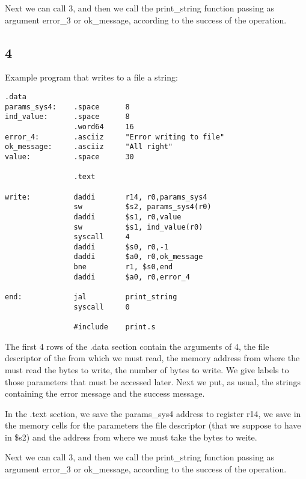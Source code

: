 Next we can call \SC{} 3, and then we call the print\_string function passing as
argument error\_3 or ok\_message, according to the success of the operation.

\OF{}

\subsection{\SC{} 4}
Example program that writes to a file a string:

\begin{lstlisting}[caption={\SC{} 4 example}, label={code:syscall4}, style={mips}]
                .data
params_sys4:    .space      8                
ind_value:      .space      8            
                .word64     16        
error_4:        .asciiz     "Error writing to file"    
ok_message:     .asciiz     "All right"    
value:          .space      30                    

                .text
            
write:          daddi       r14, r0,params_sys4        
                sw          $s2, params_sys4(r0)        
                daddi       $s1, r0,value            
                sw          $s1, ind_value(r0)            
                syscall     4                
                daddi       $s0, r0,-1
                daddi       $a0, r0,ok_message            
                bne         r1, $s0,end            
                daddi       $a0, r0,error_4

end:            jal         print_string
                syscall     0
        
                #include    print.s 
\end{lstlisting}

The first 4 rows of the .data section contain the arguments of \SC{} 4, the file
descriptor of the from which we must read, the memory address from where the \SC{}
must read the bytes to write, the number of bytes to write. We give labels to those
parameters that must be accessed later.  Next we put, as usual, the strings
containing the error message and the success message.

In the .text section, we save the params\_sys4 address to register r14, we save
in the memory cells for the \SC{} parameters the file descriptor (that we
suppose to have in \$s2) and the address from where we must take the bytes to
weite.

Next we can call \SC{} 3, and then we call the print\_string function passing as
argument error\_3 or ok\_message, according to the success of the operation.


